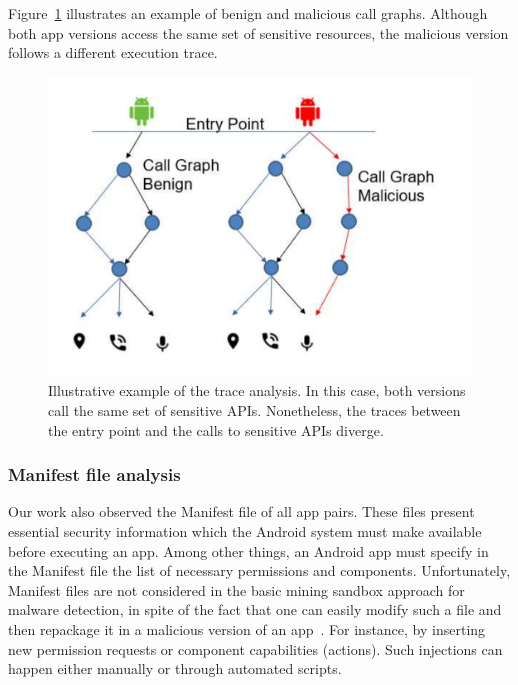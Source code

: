 Figure~\ref{fig:callGraph} illustrates an example of benign and malicious call graphs.
Although both app versions access the same set of sensitive resources, the
malicious version follows a different execution trace. 


\begin{figure}[ht]
\centering
\includegraphics[scale=0.25]{images/maliciousCallGraph.pdf}
\caption{Illustrative example of the trace analysis. In this case, both versions call the same set of sensitive APIs. Nonetheless,
 the traces between the entry point and the calls to sensitive APIs diverge.}
 \label{fig:callGraph}
\end{figure}


\subsubsection{Manifest file analysis}\label{sec:manifestAnalysis}

Our work also observed the Manifest file of all app pairs. These files present essential security information which the Android system must make available before executing an app. Among other things, an Android app must specify in the Manifest file the list of necessary permissions and components. Unfortunately, Manifest files are not considered in the basic mining sandbox approach for malware detection, in spite of the fact that one can easily modify such a file and then repackage it in a malicious version of an app~\cite{DBLP:journals/corr/abs-1208-4536}. For instance, by inserting new permission requests or component capabilities (actions). Such injections can happen either manually or through automated scripts.

